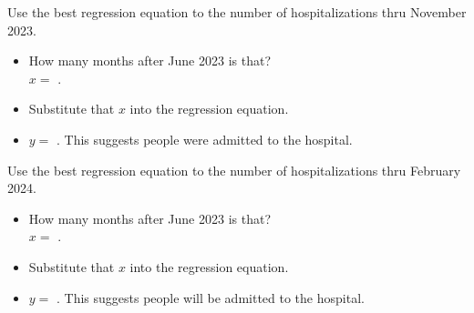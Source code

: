 \begin{minipage}{0.45\textwidth}
    \noindent 
    Use the best regression equation to  
    the number of hospitalizations  thru November 2023.
    \begin{itemize}[fullwidth,nosep]
        \item How many months after June 2023 is that?\\ $x =$ .
        \item Substitute that $x$ into the regression equation.
        \item $y =$ . 
        This suggests  people were admitted to the hospital.
    \end{itemize}
\end{minipage}
\hfill
\begin{minipage}{0.45\textwidth}
    \noindent 
    Use the best regression equation to  
    the number of hospitalizations  thru February 2024.
    \begin{itemize}[fullwidth,nosep]
        \item How many months after June 2023 is that?\\ $x =$ .
        \item Substitute that $x$ into the regression equation.
        \item $y =$ . 
        This suggests  people will be admitted to the hospital.
    \end{itemize}
\end{minipage}
